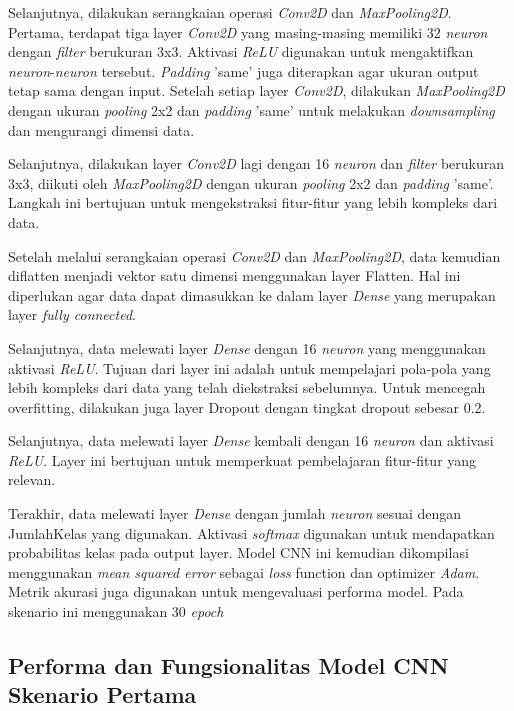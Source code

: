 Selanjutnya, dilakukan serangkaian operasi \textit{Conv2D}  dan \textit{MaxPooling2D}. Pertama, terdapat tiga layer \textit{Conv2D} yang masing-masing memiliki 32 \textit{neuron} dengan \textit{filter} berukuran 3x3. Aktivasi \textit{ReLU}  digunakan untuk mengaktifkan \textit{neuron}-\textit{neuron} tersebut. \textit{Padding} 'same' juga diterapkan agar ukuran output tetap sama dengan input. Setelah setiap layer \textit{Conv2D}, dilakukan \textit{MaxPooling2D} dengan ukuran \textit{pooling} 2x2 dan \textit{padding} 'same' untuk melakukan \textit{downsampling} dan mengurangi dimensi data.

Selanjutnya, dilakukan layer \textit{Conv2D} lagi dengan 16 \textit{neuron} dan \textit{filter} berukuran 3x3, diikuti oleh \textit{MaxPooling2D} dengan ukuran \textit{pooling} 2x2 dan \textit{padding} 'same'. Langkah ini bertujuan untuk mengekstraksi fitur-fitur yang lebih kompleks dari data.

Setelah melalui serangkaian operasi \textit{Conv2D} dan \textit{MaxPooling2D}, data kemudian diflatten menjadi vektor satu dimensi menggunakan layer Flatten. Hal ini diperlukan agar data dapat dimasukkan ke dalam layer \textit{Dense} yang merupakan layer \textit{fully connected}.

Selanjutnya, data melewati layer \textit{Dense} dengan 16 \textit{neuron} yang menggunakan aktivasi \textit{ReLU}. Tujuan dari layer ini adalah untuk mempelajari pola-pola yang lebih kompleks dari data yang telah diekstraksi sebelumnya. Untuk mencegah overfitting, dilakukan juga layer Dropout dengan tingkat dropout sebesar 0.2.

Selanjutnya, data melewati layer \textit{Dense} kembali dengan 16 \textit{neuron} dan aktivasi \textit{ReLU}. Layer ini bertujuan untuk memperkuat pembelajaran fitur-fitur yang relevan.

Terakhir, data melewati layer \textit{Dense} dengan jumlah \textit{neuron} sesuai dengan JumlahKelas yang digunakan. Aktivasi \textit{softmax} digunakan untuk mendapatkan probabilitas kelas pada output layer. Model CNN ini kemudian dikompilasi menggunakan \textit{mean squared error} sebagai \textit{loss} function dan optimizer \textit{Adam}. Metrik akurasi juga digunakan untuk mengevaluasi performa model. Pada skenario ini menggunakan 30\textit{ epoch} 

\subsection*{Performa dan Fungsionalitas Model CNN Skenario Pertama}

